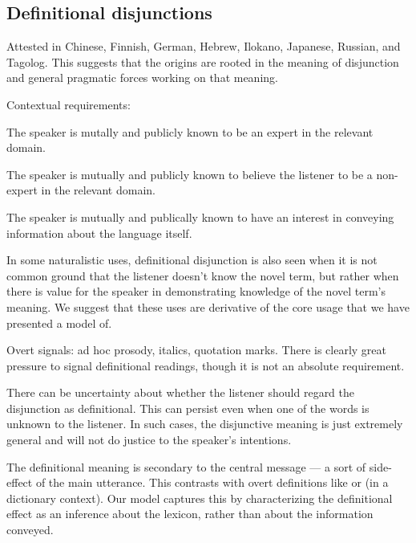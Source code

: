 \documentclass{article}
\begin{document}
\subsection{Definitional disjunctions}\label{sec:data:definitional}

\begin{examples}
\item Attested in Chinese, Finnish, German, Hebrew, Ilokano, Japanese,
  Russian, and Tagolog. This suggests that the origins are rooted in
  the meaning of disjunction and general pragmatic forces working on
  that meaning.

\item Contextual requirements: 

  \begin{examples}
  \item The speaker is mutally and publicly known to be an expert in
    the relevant domain.

  \item The speaker is mutually and publicly known to believe the
    listener to be a non-expert in the relevant domain.

  \item The speaker is mutually and publically known to have an
    interest in conveying information about the language itself.
  \end{examples}

\item In some naturalistic uses, definitional disjunction is also seen
  when it is not common ground that the listener doesn't know the
  novel term, but rather when there is value for the speaker in
  demonstrating knowledge of the novel term's meaning.  We suggest
  that these uses are derivative of the core usage that we have
  presented a model of.

\item Overt signals: ad hoc prosody, italics, quotation marks. There is
  clearly great pressure to signal definitional readings, though it is
  not an absolute requirement.

\item There can be uncertainty about whether the listener should
  regard the disjunction as definitional. This can persist even when
  one of the words is unknown to the listener. In such cases, the
  disjunctive meaning is just extremely general and will not do
  justice to the speaker's intentions.

\item The definitional meaning is secondary to the central message ---
  a sort of side-effect of the main utterance. This contrasts with
  overt definitions like  or
   (in a dictionary context). Our model
  captures this by characterizing the definitional effect as an
  inference about the lexicon, rather than about the information
  conveyed.
  

\end{examples}
\end{document}
